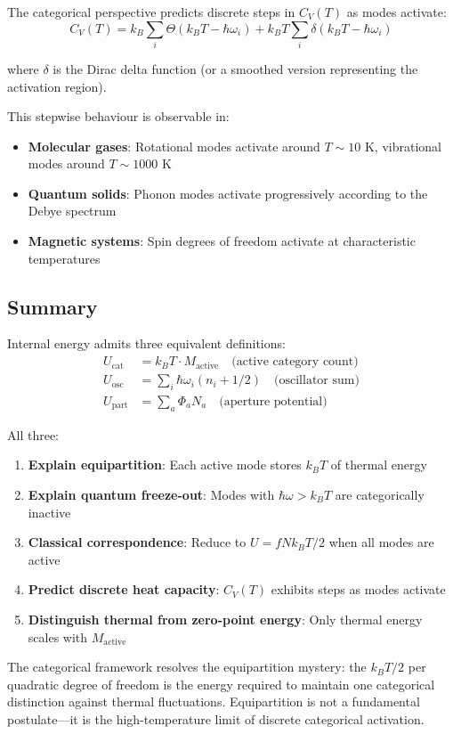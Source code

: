 The categorical perspective predicts discrete steps in $C_V(T)$ as modes activate:
\begin{equation}
C_V(T) = k_B \sum_i \Theta(k_B T - \hbar\omega_i) + k_B T \sum_i \delta(k_B T - \hbar\omega_i)
\end{equation}

where $\delta$ is the Dirac delta function (or a smoothed version representing the activation region).

This stepwise behaviour is observable in:
\begin{itemize}
\item \textbf{Molecular gases}: Rotational modes activate around $T \sim 10$ K, vibrational modes around $T \sim 1000$ K
\item \textbf{Quantum solids}: Phonon modes activate progressively according to the Debye spectrum
\item \textbf{Magnetic systems}: Spin degrees of freedom activate at characteristic temperatures
\end{itemize}

\subsection{Summary}

Internal energy admits three equivalent definitions:
\begin{align}
U_{\text{cat}} &= k_B T \cdot M_{\text{active}} \quad \text{(active category count)} \\
U_{\text{osc}} &= \sum_i \hbar\omega_i (n_i + 1/2) \quad \text{(oscillator sum)} \\
U_{\text{part}} &= \sum_a \Phi_a N_a \quad \text{(aperture potential)}
\end{align}

All three:
\begin{enumerate}
\item \textbf{Explain equipartition}: Each active mode stores $k_B T$ of thermal energy
\item \textbf{Explain quantum freeze-out}: Modes with $\hbar\omega > k_B T$ are categorically inactive
\item \textbf{Classical correspondence}: Reduce to $U = fNk_B T/2$ when all modes are active
\item \textbf{Predict discrete heat capacity}: $C_V(T)$ exhibits steps as modes activate
\item \textbf{Distinguish thermal from zero-point energy}: Only thermal energy scales with $M_{\text{active}}$
\end{enumerate}

The categorical framework resolves the equipartition mystery: the $k_B T/2$ per quadratic degree of freedom is the energy required to maintain one categorical distinction against thermal fluctuations. Equipartition is not a fundamental postulate---it is the high-temperature limit of discrete categorical activation.
